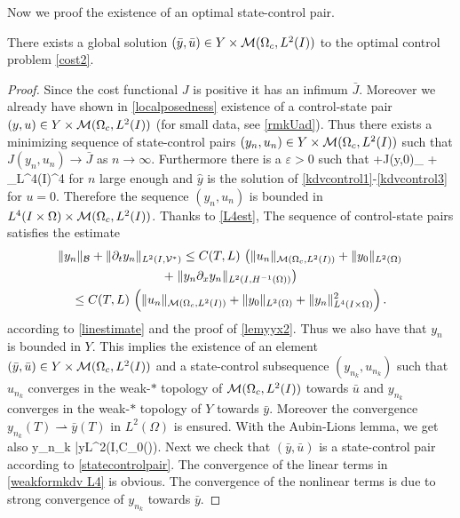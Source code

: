Now we proof the existence of an optimal state-control pair.
\begin{proposition}
There exists a global solution $(\bar y, \bar u)\in Y\times \mathcal{M}(\Omega_c, L^{2}(I)) $ to the optimal control problem \eqref{cost2}.
\end{proposition}
\begin{proof}
Since the cost functional $J$ is positive it has an infimum $\bar J$. Moreover we already have shown in \cref{localposedness} existence of a control-state pair $(y,u)\in Y\times \mathcal{M}(\Omega_c, L^{2}(I))$ (for small data, see \cref{rmkUad}). Thus there exists a minimizing sequence of state-control pairs $(y_n,u_n) \in Y\times \mathcal{M}(\Omega_c, L^{2}(I))$ such that $J(y_n, u_n) \rightarrow \bar J$ as $n \rightarrow \infty$. Furthermore there is a $\varepsilon>0$ such that
\be
\varepsilon+J(\hat y,0)\geq \alpha {}_{\M} +  _{L^4(I\times \Omega)}^4
\ee
for $n$ large enough and $\hat y$ is the solution of \eqref{kdvcontrol1}-\eqref{kdvcontrol3} for $u=0$. Therefore the sequence $(y_n,u_n)$ is bounded in $L^4(I\times\Omega)\times \mathcal{M}(\Omega_c, L^{2}(I))$. Thanks to \eqref{L4est}, {\color{blue} The sequence of control-state pairs satisfies the estimate
\begin{multline}\label{L4est}
\|y_n\|_{\mathcal{B}}+\|\partial_{t}y_n\|_{L^2(I,\mathcal{V}^{*})}\leq C(T,L)\,\left(\|u_n\|_{\M}+\|y_0\|_{L^2(\Omega)}\right.\\
+\left.\|y_n\partial_x y_n\|_{\Hm1}\right)\\
\leq C(T,L)\,\left(\|u_n\|_{\M}+\|y_0\|_{L^2(\Omega)} + \|y_n\|_{L^4(I\times\Omega)}^2\right).
\end{multline}
according to \eqref{linestimate} and the proof of \cref{lemyyx2}.} Thus we also have that $y_n$ is bounded in $Y$. This implies the existence of an element $(\bar y, \bar u)\in Y\times \mathcal{M}(\Omega_c, L^{2}(I))$ and a state-control subsequence $(y_{n_k},u_{n_k})$ such that $u_{n_k}$ converges in the weak-$*$ topology of $\mathcal{M}(\Omega_c, L^{2}(I))$ towards $\bar u$ and $y_{n_k}$ converges in the weak-$\ast$ topology of $Y$ towards $\bar y$. Moreover the convergence $y_{n_k}(T) \rightharpoonup \bar y(T)$ in $L^2(\Omega)$ is ensured. With the Aubin-Lions lemma, we get also
\be
\nonumber
y_{n_k} \rightarrow \bar y\quad{}\quad L^2(I,\mathcal C_0(\Omega)).
\ee
Next we check that $(\bar y, \bar u)$ is a state-control pair according to \cref{statecontrolpair}. The convergence of the linear terms in \eqref{weakformkdv L4} is obvious. The convergence of the nonlinear terms is due to strong convergence of $y_{n_k}$ towards $\bar y$. %

\end{proof}
